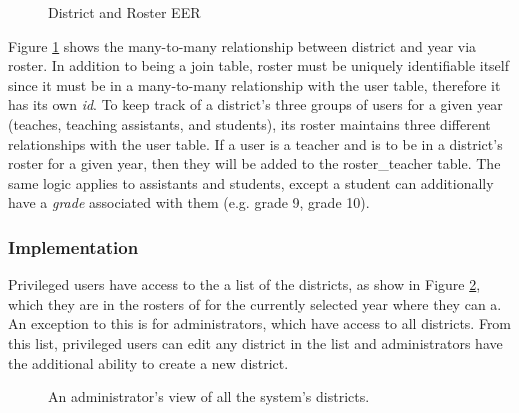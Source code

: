 \begin{figure}[h!]
	\centering
	\caption{District and Roster EER}
	\label{fig:er-district}
\end{figure}

Figure \ref{fig:er-district} shows the many-to-many relationship between district and year via roster. In addition to being a join table, roster must be uniquely identifiable itself since it must be in a many-to-many relationship with the user table, therefore it has its own \emph{id}. To keep track of a district's three groups of users for a given year (teaches, teaching assistants, and students), its roster maintains three different relationships with the user table. If a user is a teacher and is to be in a district's roster for a given year, then they will be added to the roster\_teacher table. The same logic applies to assistants and students, except a student can additionally have a \emph{grade} associated with them (e.g. grade 9, grade 10).

\subsubsection{Implementation}
Privileged users have access to the a list of the districts, as show in Figure \ref{fig:screens-district-list}, which they are in the rosters of for the currently selected year where they can a. An exception to this is for administrators, which have access to all districts. From this list, privileged users can edit any district in the list and administrators have the additional ability to create a new district.

\begin{figure}[h!]
	\centering
	\caption{An administrator's view of all the system's districts.}
	\label{fig:screens-district-list}
\end{figure}


